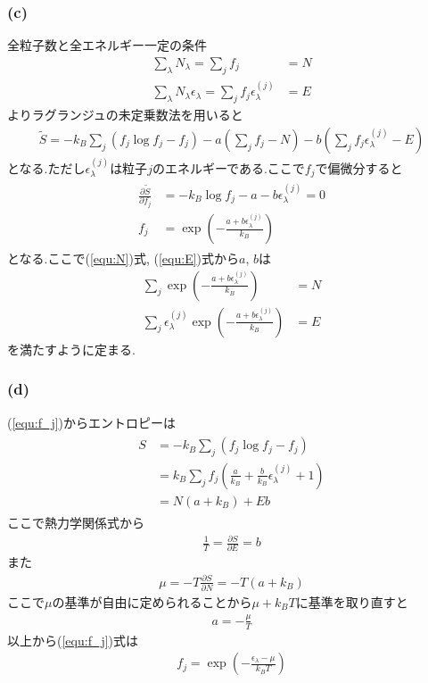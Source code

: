\subsubsection*{(c)}
全粒子数と全エネルギー一定の条件
\begin{align}
  \label{equ:N}
  \sum_\lambda N_\lambda=\sum_jf_j&=N\\
  \label{equ:E}
  \sum_\lambda N_\lambda\epsilon_\lambda=\sum_jf_j\epsilon_\lambda^{(j)}&=E
\end{align}
よりラグランジュの未定乗数法を用いると
\begin{align}
  \tilde{S}=-k_B\sum_j\left(f_j\log f_j-f_j\right)-a\left(\sum_j f_j-N\right)-b\left(\sum_j f_j\epsilon_\lambda^{(j)}-E\right)
\end{align}
となる.ただし$\epsilon_\lambda^{(j)}$は粒子$j$のエネルギーである.ここで$f_j$で偏微分すると
\begin{align}
  \begin{split}
    \label{equ:f_j}
    \frac{\partial\tilde{S}}{\partial f_j}&=-k_B\log f_j-a-b\epsilon_\lambda^{(j)}=0\\
    f_j&=\exp\left(-\frac{a+b\epsilon_\lambda^{(j)}}{k_B}\right)
  \end{split}
\end{align}
となる.ここで(\ref{equ:N})式, (\ref{equ:E})式から$a$, $b$は
\begin{align}
  \sum_j \exp\left(-\frac{a+b\epsilon_\lambda^{(j)}}{k_B}\right)&=N\\
  \sum_j \epsilon_\lambda^{(j)}\exp\left(-\frac{a+b\epsilon_\lambda^{(j)}}{k_B}\right)&=E
\end{align}
を満たすように定まる.
\subsubsection*{(d)}
(\ref{equ:f_j})からエントロピーは
\begin{align}
  \begin{split}
    S&=-k_B\sum_j(f_j\log f_j-f_j)\\
    &=k_B\sum_j f_j\left(\frac{a}{k_B}+\frac{b}{k_B}\epsilon_\lambda^{(j)}+1\right)\\
    &=N(a+k_B)+Eb
  \end{split}
\end{align}
ここで熱力学関係式から
\begin{align}
  \frac{1}{T}=\frac{\partial S}{\partial E}=b
\end{align}
また
\begin{align}
  \mu=-T\frac{\partial S}{\partial N}=-T(a+k_B)
\end{align}
ここで$\mu$の基準が自由に定められることから$\mu+k_BT$に基準を取り直すと
\begin{align}
  a=-\frac{\mu}{T}
\end{align}
以上から(\ref{equ:f_j})式は
\begin{align}
  f_j=\exp\left(-\frac{\epsilon_\lambda-\mu}{k_BT}\right)
\end{align}